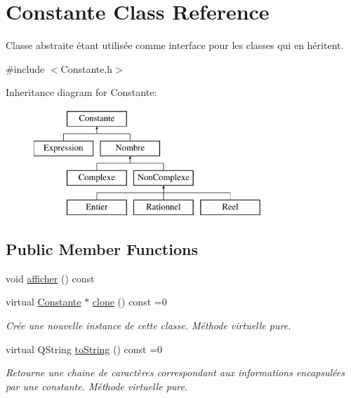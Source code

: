 \hypertarget{classConstante}{\section{\-Constante \-Class \-Reference}
\label{classConstante}
}


\-Classe abstraite étant utilisée comme interface pour les classes qui en héritent.  




{\ttfamily \#include $<$\-Constante.\-h$>$}

\-Inheritance diagram for \-Constante\-:\begin{figure}[H]
\begin{center}
\leavevmode
\includegraphics[height=4.000000cm]{classConstante}
\end{center}
\end{figure}
\subsection*{\-Public \-Member \-Functions}
\begin{DoxyCompactItemize}
\item 
void \hyperlink{classConstante_aa1c1c46c040775cbbdf5bee0bba452f9}{afficher} () const 
\item 
virtual \hyperlink{classConstante}{\-Constante} $\ast$ \hyperlink{classConstante_a5769ea385161e02bd2d1bcadefc2c510}{clone} () const =0
\begin{DoxyCompactList}\small\item\em \-Crée une nouvelle instance de cette classe. \-Méthode virtuelle pure. \end{DoxyCompactList}\item 
virtual \-Q\-String \hyperlink{classConstante_ad5ea6850196ee9f86b74c74009a87ab1}{to\-String} () const =0
\begin{DoxyCompactList}\small\item\em \-Retourne une chaine de caractères correspondant aux informations encapsulées par une constante. \-Méthode virtuelle pure. \end{DoxyCompactList}\end{DoxyCompactItemize}


